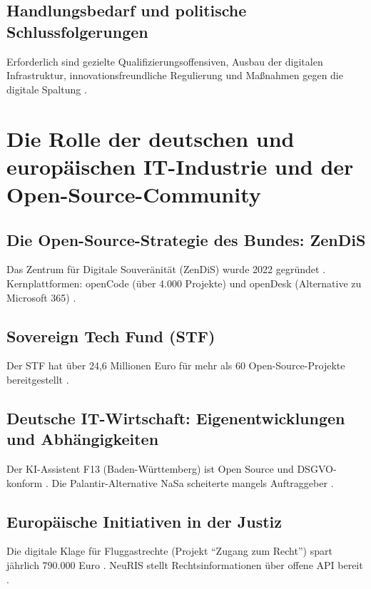 \documentclass[12pt,a4paper]{article}
\begin{document}
	\subsection{Handlungsbedarf und politische Schlussfolgerungen}
	
	Erforderlich sind gezielte Qualifizierungsoffensiven, Ausbau der digitalen Infrastruktur, innovationsfreundliche Regulierung und Maßnahmen gegen die digitale Spaltung \cite{IAB2025a, OECD2025, Bitkom2025}.
	
	\section{Die Rolle der deutschen und europäischen IT-Industrie und der Open-Source-Community}
	
	\subsection{Die Open-Source-Strategie des Bundes: ZenDiS}
	
	Das Zentrum für Digitale Souveränität (ZenDiS) wurde 2022 gegründet \cite{ZenDiS2025}. Kernplattformen: openCode (über 4.000 Projekte) und openDesk (Alternative zu Microsoft 365) \cite{Heise2025a, AllThingsOpen2025}.
	
	\subsection{Sovereign Tech Fund (STF)}
	
	Der STF hat über 24,6 Millionen Euro für mehr als 60 Open-Source-Projekte bereitgestellt \cite{SovereignTechFund2025}.
	
	\subsection{Deutsche IT-Wirtschaft: Eigenentwicklungen und Abhängigkeiten}
	
	Der KI-Assistent F13 (Baden-Württemberg) ist Open Source und DSGVO-konform \cite{Staatsanzeiger2025}. Die Palantir-Alternative NaSa scheiterte mangels Auftraggeber \cite{Tagesschau2025b}.
	
	\subsection{Europäische Initiativen in der Justiz}
	
	Die digitale Klage für Fluggastrechte (Projekt \enquote{Zugang zum Recht}) spart jährlich 790.000 Euro \cite{Heise2025c}. NeuRIS stellt Rechtsinformationen über offene API bereit \cite{NeuRIS2025}.
	
\end{document}

